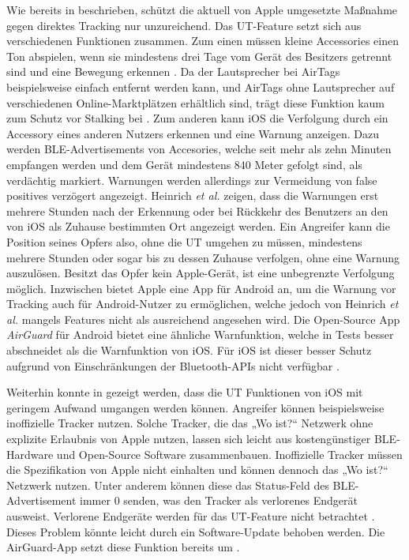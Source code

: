 Wie bereits in  beschrieben, schützt die aktuell von Apple umgesetzte Maßnahme gegen direktes Tracking nur unzureichend.
Das \ac{UT}-Feature setzt sich aus verschiedenen Funktionen zusammen.
Zum einen müssen kleine Accessories einen Ton abspielen, wenn sie mindestens drei Tage vom Gerät des Besitzers getrennt sind und eine Bewegung erkennen \cite{Apple_FindMySpec}.
Da der Lautsprecher bei AirTags beispielsweise einfach entfernt werden kann, und AirTags ohne Lautsprecher auf verschiedenen Online-Marktplätzen erhältlich sind, trägt diese Funktion kaum zum Schutz vor Stalking bei \cite{Heinrich_AirGuard}.
Zum anderen kann iOS die Verfolgung durch ein Accessory eines anderen Nutzers erkennen und eine Warnung anzeigen.
Dazu werden \ac{BLE}-Advertisements von Accesories, welche seit mehr als zehn Minuten empfangen werden und dem Gerät mindestens 840 Meter gefolgt sind, als verdächtig markiert.
Warnungen werden allerdings zur Vermeidung von false positives verzögert angezeigt.
Heinrich \textit{et al.} \cite{Heinrich_AirGuard} zeigen, dass die Warnungen erst mehrere Stunden nach der Erkennung oder bei Rückkehr des Benutzers an den von iOS als Zuhause bestimmten Ort angezeigt werden.
Ein Angreifer kann die Position seines Opfers also, ohne die \ac{UT} umgehen zu müssen, mindestens mehrere Stunden oder sogar bis zu dessen Zuhause verfolgen, ohne eine Warnung auszulösen.
Besitzt das Opfer kein Apple-Gerät, ist eine unbegrenzte Verfolgung möglich.
Inzwischen bietet Apple eine App für Android an, um die Warnung vor Tracking auch für Android-Nutzer zu ermöglichen, welche jedoch von Heinrich \textit{et al.} \cite{Heinrich_AirGuard} mangels Features nicht als ausreichend angesehen wird.
Die Open-Source App \textit{AirGuard} für Android bietet eine ähnliche Warnfunktion, welche in Tests besser abschneidet als die Warnfunktion von iOS.
Für iOS ist dieser besser Schutz aufgrund von Einschränkungen der Bluetooth-\acp{API} nicht verfügbar \cite{Heinrich_AirGuard}.

Weiterhin konnte in \cite{Heinrich_AirGuard,Mayberry_Tracking} gezeigt werden, dass die \ac{UT} Funktionen von iOS mit geringem Aufwand umgangen werden können.
Angreifer können beispielsweise inoffizielle Tracker nutzen.
Solche Tracker, die das „Wo ist?“ Netzwerk ohne explizite Erlaubnis von Apple nutzen, lassen sich leicht aus kostengünstiger \ac{BLE}-Hardware und Open-Source Software zusammenbauen.
Inoffizielle Tracker müssen die Spezifikation von Apple nicht einhalten und können dennoch das „Wo ist?“ Netzwerk nutzen.
Unter anderem können diese das Status-Feld des \ac{BLE}-Advertisement immer 0 senden, was den Tracker als verlorenes Endgerät ausweist.
Verlorene Endgeräte werden für das \ac{UT}-Feature nicht betrachtet \cite{Heinrich_AirGuard,Mayberry_Tracking}.
Dieses Problem könnte leicht durch ein Software-Update behoben werden.
Die AirGuard-App setzt diese Funktion bereits um \cite{Heinrich_AirGuard}.

